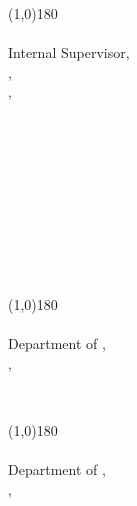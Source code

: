 \normalsize
\onehalfspacing
\vspace{75pt}
\begin{minipage}{0.4\textwidth}
    \begin{center}
        \line(1,0){180}\\
        {\InternalSupervisor{}\\
        Internal Supervisor,\\
        \InternalSupervisorDept{},\\
        \InstituteNameShort{}, \InstituteCity{}
        }    
    \end{center}   
\end{minipage}\begin{minipage}{0.19\textwidth}
    ~
\end{minipage}\begin{minipage}{0.4\textwidth}
    \begin{center}
       ~\\~\\~\\~\\~
    \end{center}
\end{minipage}
\vspace{75pt}\\
\begin{minipage}{0.4\textwidth}
    \begin{center}
        \line(1,0){180}\\
        {\ExaminerOne{}\\
        Department of \Subject{}, \\
        \InstituteNameShort{}, \InstituteCity{}}
    \end{center}     
\end{minipage}\begin{minipage}{0.19\textwidth}
    ~
\end{minipage}\begin{minipage}{0.4\textwidth}
    \begin{center}
        \line(1,0){180}\\
        {\ExaminerTwo{}\\
        Department of \Subject{},\\
        \InstituteNameShort{}, \InstituteCity{}}
    \end{center}   
\end{minipage}
\vspace{10pt}\\

